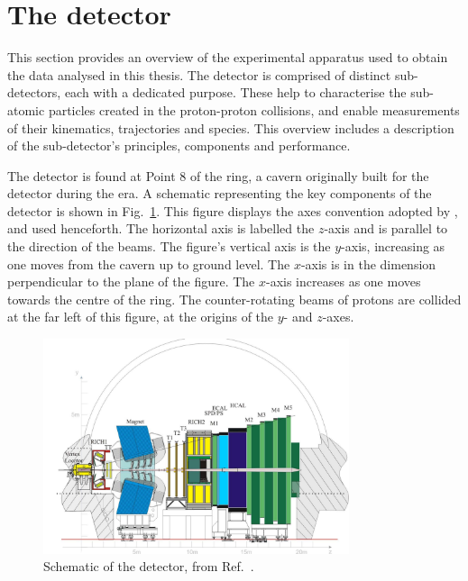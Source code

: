 \section{The \lhcb detector}

This section provides an overview of the experimental apparatus used to obtain the data analysed in this thesis.
The \lhcb detector is comprised of distinct sub-detectors, each with a dedicated purpose. These help to characterise the sub-atomic particles created in the proton-proton collisions, and enable measurements of their kinematics, trajectories and species.
This overview includes a description of the sub-detector's principles, components and performance. 

The \lhcb detector is found at Point 8 of the \lhc ring, a cavern originally built for the {\color{Red}\delphi} detector during the \lep era. A schematic representing the key components of the \lhcb detector is shown in Fig.~\ref{fig:Dec_lhcb_Schematic}. This figure displays the axes convention adopted by \lhcb, and used henceforth. The horizontal axis is labelled the $z$-axis and is parallel to the direction of the beams. The figure's vertical axis is the $y$-axis, increasing as one moves from the cavern up to ground level. The $x$-axis is in the dimension perpendicular to the plane of the figure. The $x$-axis increases as one moves towards the centre of the \lhc ring. The counter-rotating beams of protons are collided at the far left of this figure, at the origins of the $y$- and $z$-axes.   

\begin{figure}[!h]
    \centering
    \includegraphics[width=0.8\textwidth]{figs/Detector/LHCb_Detector_Schematic.pdf}
    \caption{Schematic of the \lhcb detector, from Ref.~\cite{Alves:2008zz}.}
    \label{fig:Dec_lhcb_Schematic}   
\end{figure}



